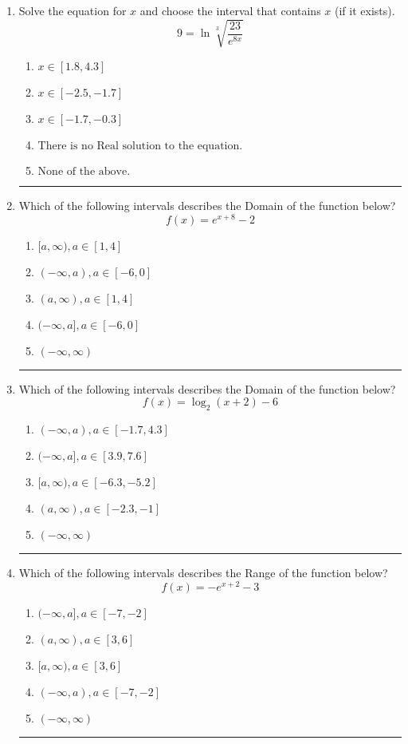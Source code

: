 \documentclass[14pt]{extbook}
\newcommand{\litem}[1]{\item#1\hspace*{-1cm}\rule{\textwidth}{0.4pt}}
\begin{document}
\begin{enumerate}
{\begin{enumerate}[label=\Alph*.]
\end{enumerate} }
\litem{
 Solve the equation for $x$ and choose the interval that contains $x$ (if it exists).\[  9 = \ln{\sqrt[3]{\frac{23}{e^{8x}}}} \]\begin{enumerate}[label=\Alph*.]
\item \( x \in [1.8, 4.3] \)
\item \( x \in [-2.5, -1.7] \)
\item \( x \in [-1.7, -0.3] \)
\item \( \text{There is no Real solution to the equation.} \)
\item \( \text{None of the above.} \)

\end{enumerate} }
\litem{
Which of the following intervals describes the Domain of the function below?\[ f(x) = e^{x+8}-2 \]\begin{enumerate}[label=\Alph*.]
\item \( [a, \infty), a \in [1, 4] \)
\item \( (-\infty, a), a \in [-6, 0] \)
\item \( (a, \infty), a \in [1, 4] \)
\item \( (-\infty, a], a \in [-6, 0] \)
\item \( (-\infty, \infty) \)

\end{enumerate} }
\litem{
Which of the following intervals describes the Domain of the function below?\[ f(x) = \log_2{(x+2)}-6 \]\begin{enumerate}[label=\Alph*.]
\item \( (-\infty, a), a \in [-1.7, 4.3] \)
\item \( (-\infty, a], a \in [3.9, 7.6] \)
\item \( [a, \infty), a \in [-6.3, -5.2] \)
\item \( (a, \infty), a \in [-2.3, -1] \)
\item \( (-\infty, \infty) \)

\end{enumerate} }
\litem{
Which of the following intervals describes the Range of the function below?\[ f(x) = -e^{x+2}-3 \]\begin{enumerate}[label=\Alph*.]
\item \( (-\infty, a], a \in [-7, -2] \)
\item \( (a, \infty), a \in [3, 6] \)
\item \( [a, \infty), a \in [3, 6] \)
\item \( (-\infty, a), a \in [-7, -2] \)
\item \( (-\infty, \infty) \)


\end{enumerate}}
\end{enumerate}
\end{document}
